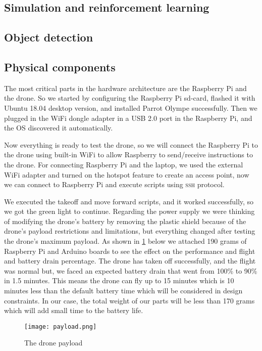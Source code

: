 \documentclass[../main.tex]{subfiles}
\begin{document}
\subsection{Simulation and reinforcement learning}

\lipsum[1]

\subsection{Object detection}

\lipsum[1]

\subsection{Physical components}
The most critical parts in the hardware
architecture are the Raspberry Pi and the drone. 
So we started by configuring the Raspberry Pi sd-card,
flashed it with Ubuntu 18.04 desktop version,
and installed Parrot Olympe successfully. 
Then we plugged in the WiFi dongle adapter
in a USB 2.0 port in the Raspberry Pi, 
and the OS discovered it automatically. 

Now everything is ready to test the 
\anafi drone, so we will connect the
Raspberry Pi to the drone using built-in WiFi
to allow Raspberry to send/receive instructions
to the drone. 
For connecting Raspberry Pi and the laptop, 
we used the external WiFi adapter and turned on the hotspot feature to create an access point,
now we can connect to Raspberry Pi and execute 
scripts using \textsc{ssh} protocol.

We executed the takeoff and move forward scripts,
and it worked successfully, so we got the green 
light to continue. 
Regarding the power supply we were thinking of modifying the drone's battery
by removing the plastic shield because of the drone's
payload restrictions and limitations, but everything changed after 
testing the drone's maximum payload. As shown in \cref{fig:payload} below
we attached 190 grams of Raspberry Pi and Arduino boards
to see the effect on the performance and flight and
battery drain percentage. 
The drone has taken off  successfully, 
and the flight was normal but, we faced an expected 
battery drain that went from 100\% to 90\% in 1.5 minutes.
This means the drone can fly up to 15 minutes which is 
10 minutes less than the default battery time 
which will be considered in design constraints.
In our case, the total weight of our parts will be 
less than 170 grams which will add small time
to the battery life.
\begin{figure}[tbp]
	\centering
	\texttt{[image: payload.png]}
	\caption{The drone payload}
	\label{fig:payload}
\end{figure} 
\end{document}

